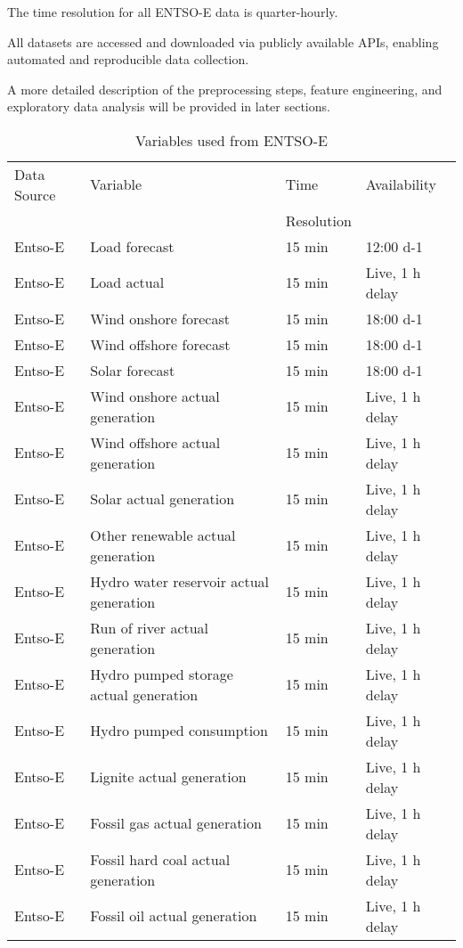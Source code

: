 \documentclass[class=scrbook, crop=false]{standalone}
\begin{document}
The time resolution for all ENTSO-E data is quarter-hourly.

All datasets are accessed and downloaded via publicly available APIs, enabling automated and reproducible data collection.

A more detailed description of the preprocessing steps, feature engineering, and exploratory data analysis will be provided in later sections.


\begin{table}[]
\centering
\begin{tabular}{l|l|l|l}
 Data Source & Variable &  Time  & Availability  \\
 &&Resolution&\\\hline
 Entso-E & Load forecast & 15 min  & 12:00 d-1 \\
 Entso-E & Load actual & 15 min  &Live, 1 h delay \\
 Entso-E & Wind onshore forecast & 15 min  & 18:00 d-1\\
 Entso-E & Wind offshore forecast & 15 min & 18:00 d-1 \\
 Entso-E & Solar forecast & 15 min & 18:00 d-1 \\
 Entso-E & Wind onshore actual generation & 15 min  &Live, 1 h delay\\
 Entso-E & Wind offshore actual generation & 15 min &Live, 1 h delay \\
 Entso-E & Solar actual generation & 15 min & Live, 1 h delay \\
 Entso-E & Other renewable actual generation & 15 min &Live, 1 h delay \\
 Entso-E & Hydro water reservoir actual generation & 15 min & Live, 1 h delay \\
 Entso-E & Run of river actual generation & 15 min &Live, 1 h delay \\
 Entso-E & Hydro pumped storage actual generation & 15 min & Live, 1 h delay \\
 Entso-E & Hydro pumped consumption & 15 min & Live, 1 h delay \\
 Entso-E & Lignite actual generation & 15 min & Live, 1 h delay \\
 Entso-E & Fossil gas actual generation & 15 min & Live, 1 h delay \\
 Entso-E & Fossil hard coal actual generation & 15 min & Live, 1 h delay \\
 Entso-E & Fossil oil actual generation & 15 min & Live, 1 h delay \\
  
\end{tabular}
\caption{Variables used from ENTSO-E}
\label{Table::Energy_Data_Entsoe}
\end{table}
\end{document}
